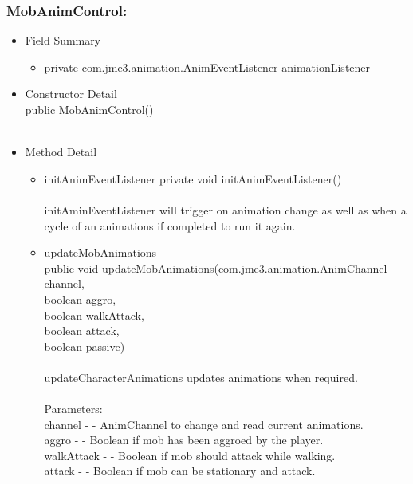 \documentclass[letterpaper]{article}
\begin{document}
				\subsubsection*{MobAnimControl:}
				\vspace{0.1in}	
					\begin{itemize}
						\item	Field Summary
								\begin{itemize}
									\item	private com.jme3.animation.AnimEventListener	animationListener	
								\end{itemize}
						\item	Constructor Detail \\
								public MobAnimControl() \\ \\
						\item	Method Detail
								\begin{itemize}
									\item	initAnimEventListener
											private void initAnimEventListener() \\ \\
											initAminEventListener will trigger on animation change as well as when a cycle of an animations if completed to run it again.
									\item	updateMobAnimations \\
											public void updateMobAnimations(com.jme3.animation.AnimChannel channel, \\
		                       boolean aggro, \\
		                       boolean walkAttack, \\
		                       boolean attack, \\
		                       boolean passive) \\ \\
											updateCharacterAnimations updates animations when required. \\ \\
											Parameters: \\
											channel - - AnimChannel to change and read current animations. \\
											aggro - - Boolean if mob has been aggroed by the player. \\
											walkAttack - - Boolean if mob should attack while walking. \\
											attack - - Boolean if mob can be stationary and attack. \\

\end{itemize}
\end{itemize}
\end{document}
